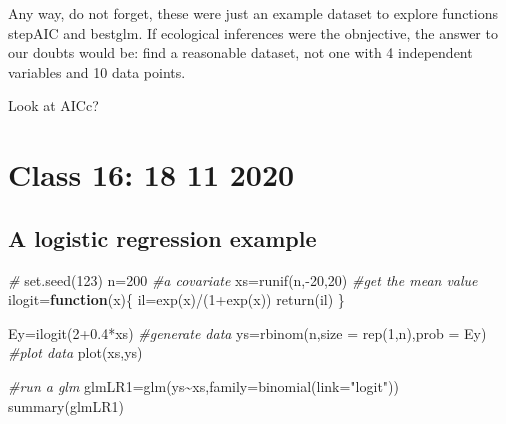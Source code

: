 \documentclass[
]{book}
\newenvironment{Shaded}{\begin{snugshade}}{\end{snugshade}}
\newcommand{\AttributeTok}[1]{\textcolor[rgb]{0.77,0.63,0.00}{#1}}
\newcommand{\CommentTok}[1]{\textcolor[rgb]{0.56,0.35,0.01}{\textit{#1}}}
\newcommand{\ControlFlowTok}[1]{\textcolor[rgb]{0.13,0.29,0.53}{\textbf{#1}}}
\newcommand{\DecValTok}[1]{\textcolor[rgb]{0.00,0.00,0.81}{#1}}
\newcommand{\FloatTok}[1]{\textcolor[rgb]{0.00,0.00,0.81}{#1}}
\newcommand{\FunctionTok}[1]{\textcolor[rgb]{0.00,0.00,0.00}{#1}}
\newcommand{\NormalTok}[1]{#1}
\newcommand{\OtherTok}[1]{\textcolor[rgb]{0.56,0.35,0.01}{#1}}
\newcommand{\SpecialCharTok}[1]{\textcolor[rgb]{0.00,0.00,0.00}{#1}}
\newcommand{\StringTok}[1]{\textcolor[rgb]{0.31,0.60,0.02}{#1}}
\begin{document}
Any way, do not forget, these were just an example dataset to explore functions stepAIC and bestglm. If ecological inferences were the obnjective, the answer to our doubts would be: find a reasonable dataset, not one with 4 independent variables and 10 data points.

Look at AICc?

\hypertarget{aula16}{%
\chapter{Class 16: 18 11 2020}\label{aula16}}

\hypertarget{a-logistic-regression-example}{%
\section{A logistic regression example}\label{a-logistic-regression-example}}

\begin{Shaded}
\begin{Highlighting}[]
\CommentTok{\#}
\FunctionTok{set.seed}\NormalTok{(}\DecValTok{123}\NormalTok{)}
\NormalTok{n}\OtherTok{=}\DecValTok{200}
\CommentTok{\#a covariate}
\NormalTok{xs}\OtherTok{=}\FunctionTok{runif}\NormalTok{(n,}\SpecialCharTok{{-}}\DecValTok{20}\NormalTok{,}\DecValTok{20}\NormalTok{)}
\CommentTok{\#get the mean value}
\NormalTok{ilogit}\OtherTok{=}\ControlFlowTok{function}\NormalTok{(x)\{}
\NormalTok{  il}\OtherTok{=}\FunctionTok{exp}\NormalTok{(x)}\SpecialCharTok{/}\NormalTok{(}\DecValTok{1}\SpecialCharTok{+}\FunctionTok{exp}\NormalTok{(x))}
\FunctionTok{return}\NormalTok{(il)}
\NormalTok{\}}

\NormalTok{Ey}\OtherTok{=}\FunctionTok{ilogit}\NormalTok{(}\DecValTok{2}\FloatTok{+0.4}\SpecialCharTok{*}\NormalTok{xs)}
\CommentTok{\#generate data}
\NormalTok{ys}\OtherTok{=}\FunctionTok{rbinom}\NormalTok{(n,}\AttributeTok{size =} \FunctionTok{rep}\NormalTok{(}\DecValTok{1}\NormalTok{,n),}\AttributeTok{prob =}\NormalTok{ Ey)}
\CommentTok{\#plot data}
\FunctionTok{plot}\NormalTok{(xs,ys)}


\CommentTok{\#run a glm}
\NormalTok{glmLR1}\OtherTok{=}\FunctionTok{glm}\NormalTok{(ys}\SpecialCharTok{\textasciitilde{}}\NormalTok{xs,}\AttributeTok{family=}\FunctionTok{binomial}\NormalTok{(}\AttributeTok{link=}\StringTok{"logit"}\NormalTok{))}
\FunctionTok{summary}\NormalTok{(glmLR1)}
\end{Highlighting}
\end{Shaded}
\end{document}
